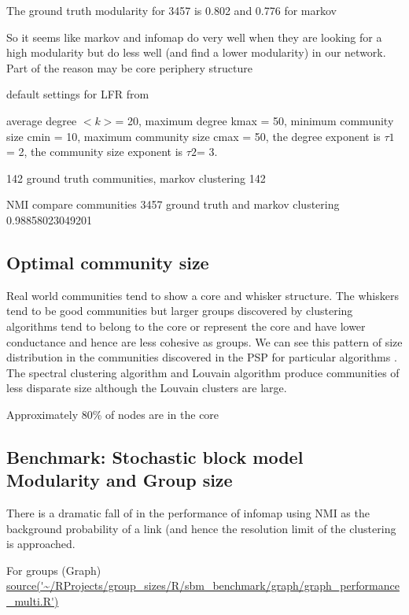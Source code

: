 The ground truth modularity for 3457 is 0.802 and 0.776 for markov

So it seems like markov and infomap do very well when they are looking for a high modularity but do less well (and find a lower modularity) in our network. Part of the reason may be core periphery structure


default settings for LFR from  \cite{lancichinetti2012consensus}

average degree $<k>$= 20, maximum degree kmax = 50, minimum community size cmin = 10, maximum community size cmax = 50, the degree exponent is $\tau1$ = 2, the community size exponent is $\tau2$= 3. 

142 ground truth communities, markov clustering 142

NMI compare communities 3457 ground truth and markov clustering 0.98858023049201

\subsection{Optimal community size}
Real world communities tend to show a core and whisker structure. The whiskers tend to be good communities but larger groups discovered by clustering algorithms tend to belong to the core or represent the core and have lower conductance and hence are less cohesive as groups. We can see this pattern of size distribution in the communities discovered in the PSP for particular algorithms . The spectral clustering algorithm and Louvain algorithm produce communities of less disparate size although the Louvain clusters are large. 

Approximately 80\% of nodes are in the core 

\cite{leskovec2010empirical}

\subsection{Benchmark: Stochastic block model Modularity and Group size}
\label{sec:benchmark sbm}
There is a dramatic fall of in the performance of infomap using NMI as the background probability of a link (and hence the resolution limit of the clustering is approached.

For groups (Graph)  \url{source('~/RProjects/group_sizes/R/sbm_benchmark/graph/graph_performance_multi.R')}

